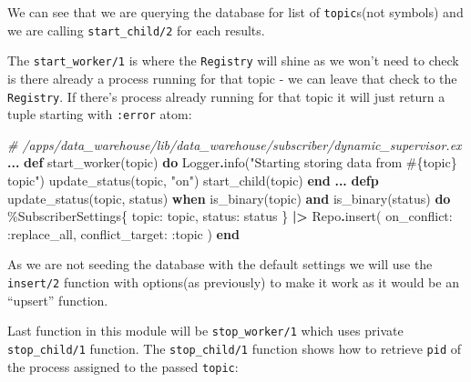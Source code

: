 \documentclass[
]{book}
\newenvironment{Shaded}{\begin{snugshade}}{\end{snugshade}}
\newcommand{\CommentTok}[1]{\textcolor[rgb]{0.56,0.35,0.01}{\textit{#1}}}
\newcommand{\ConstantTok}[1]{\textcolor[rgb]{0.00,0.00,0.00}{#1}}
\newcommand{\KeywordTok}[1]{\textcolor[rgb]{0.13,0.29,0.53}{\textbf{#1}}}
\newcommand{\NormalTok}[1]{#1}
\newcommand{\OperatorTok}[1]{\textcolor[rgb]{0.81,0.36,0.00}{\textbf{#1}}}
\newcommand{\OtherTok}[1]{\textcolor[rgb]{0.56,0.35,0.01}{#1}}
\newcommand{\StringTok}[1]{\textcolor[rgb]{0.31,0.60,0.02}{#1}}
\newcommand{\VariableTok}[1]{\textcolor[rgb]{0.00,0.00,0.00}{#1}}
\begin{document}
We can see that we are querying the database for list of \texttt{topic}s(not symbols) and we are calling \texttt{start\_child/2} for each results.

The \texttt{start\_worker/1} is where the \texttt{Registry} will shine as we won't need to check is there already a process running for that topic - we can leave that check to the \texttt{Registry}. If there's process already running for that topic it will just return a tuple starting with \texttt{:error} atom:

\begin{Shaded}
\begin{Highlighting}[]
  \CommentTok{\# /apps/data\_warehouse/lib/data\_warehouse/subscriber/dynamic\_supervisor.ex}
  \OperatorTok{...}
  \KeywordTok{def}\NormalTok{ start\_worker(topic) }\KeywordTok{do}
    \ConstantTok{Logger}\OperatorTok{.}\NormalTok{info(}\StringTok{"Starting storing data from }\OtherTok{\#\{}\NormalTok{topic}\OtherTok{\}}\StringTok{ topic"}\NormalTok{)}
\NormalTok{    update\_status(topic, }\StringTok{"on"}\NormalTok{)}
\NormalTok{    start\_child(topic)}
  \KeywordTok{end}
  \OperatorTok{...}
  \KeywordTok{defp}\NormalTok{ update\_status(topic, status)}
       \KeywordTok{when}\NormalTok{ is\_binary(topic) }\KeywordTok{and}\NormalTok{ is\_binary(status) }\KeywordTok{do}
\NormalTok{    \%}\ConstantTok{SubscriberSettings}\NormalTok{\{}
      \VariableTok{topic:}\NormalTok{ topic,}
      \VariableTok{status:}\NormalTok{ status}
\NormalTok{    \}}
    \OperatorTok{|\textgreater{}} \ConstantTok{Repo}\OperatorTok{.}\NormalTok{insert(}
      \VariableTok{on\_conflict:} \VariableTok{:replace\_all}\NormalTok{,}
      \VariableTok{conflict\_target:} \VariableTok{:topic}
\NormalTok{    )}
  \KeywordTok{end}
\end{Highlighting}
\end{Shaded}

As we are not seeding the database with the default settings we will use the \texttt{insert/2} function with options(as previously) to make it work as it would be an ``upsert'' function.

Last function in this module will be \texttt{stop\_worker/1} which uses private \texttt{stop\_child/1} function. The \texttt{stop\_child/1} function shows how to retrieve \texttt{pid} of the process assigned to the passed \texttt{topic}:
\end{document}
